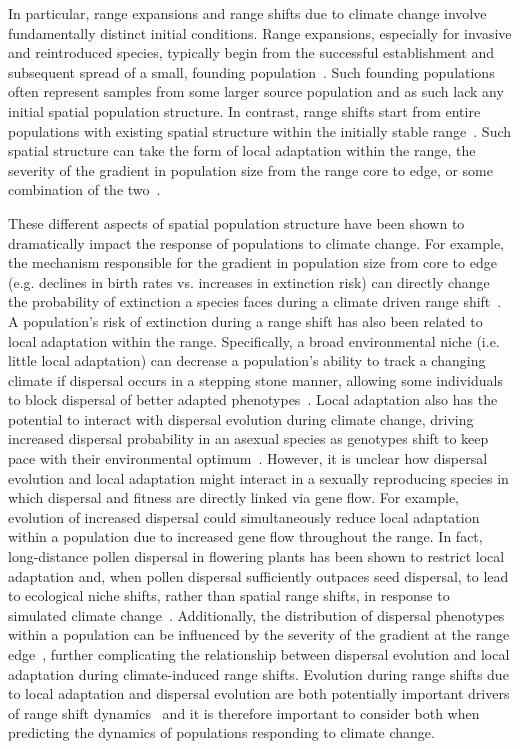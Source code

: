 \documentclass[11pt, oneside]{article}
\begin{document}
In particular, range expansions and range shifts due to climate change involve fundamentally distinct initial conditions. Range expansions, especially for invasive and reintroduced species, typically begin from the successful establishment and subsequent spread of a small, founding population~\citep{hastings2005spatial}. Such founding populations often represent samples from some larger source population and as such lack any initial spatial population structure. In contrast, range shifts start from entire populations with existing spatial structure within the initially stable range~\citep{hargreaves2014evolution}. Such spatial structure can take the form of local adaptation within the range, the severity of the gradient in population size from the range core to edge, or some combination of the two~\citep{hargreaves2014evolution, hargreaves2015fitness, henry2013eco}. 

These different aspects of spatial population structure have been shown to dramatically impact the response of populations to climate change. For example, the mechanism responsible for the gradient in population size from core to edge (e.g. declines in birth rates vs. increases in extinction risk) can directly change the probability of extinction a species faces during a climate driven range shift~\citep{henry2013eco}. A population's risk of extinction during a range shift has also been related to local adaptation within the range. Specifically, a broad environmental niche (i.e. little local adaptation) can decrease a population's ability to track a changing climate if dispersal occurs in a stepping stone manner, allowing some individuals to block dispersal of better adapted phenotypes~\citep{atkins2010local}. Local adaptation also has the potential to interact with dispersal evolution during climate change, driving increased dispersal probability in an asexual species as genotypes shift to keep pace with their environmental optimum~\citep{hargreaves2015fitness}. However, it is unclear how dispersal evolution and local adaptation might interact in a sexually reproducing species in which dispersal and fitness are directly linked via gene flow. For example, evolution of increased dispersal could simultaneously reduce local adaptation within a population due to increased gene flow throughout the range. In fact, long-distance pollen dispersal in flowering plants has been shown to restrict local adaptation and, when pollen dispersal sufficiently outpaces seed dispersal, to lead to ecological niche shifts, rather than spatial range shifts, in response to simulated climate change~\citep{aguilee2016pollen}. Additionally, the distribution of dispersal phenotypes within a population can be influenced by the severity of the gradient at the range edge~\citep{henry2013eco, hargreaves2014evolution}, further complicating the relationship between dispersal evolution and local adaptation during climate-induced range shifts. Evolution during range shifts due to local adaptation and dispersal evolution are both potentially important drivers of range shift dynamics~\citep{van2016spatial} and it is therefore important to consider both when predicting the dynamics of populations responding to climate change.
\end{document}
